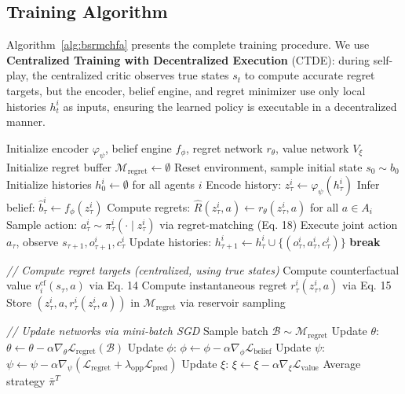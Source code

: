 \documentclass{article}
\begin{document}
\subsection{Training Algorithm}

Algorithm~\ref{alg:bsrmchfa} presents the complete training procedure. We use \textbf{Centralized Training with Decentralized Execution} (CTDE): during self-play, the centralized critic observes true states $s_t$ to compute accurate regret targets, but the encoder, belief engine, and regret minimizer use only local histories $h_t^i$ as inputs, ensuring the learned policy is executable in a decentralized manner.

\begin{algorithm}[t]
\caption{B-SRM-CHFA Training}
\label{alg:bsrmchfa}
\begin{algorithmic}[1]
\STATE Initialize encoder $\varphi_\psi$, belief engine $f_\phi$, regret network $r_\theta$, value network $V_\xi$
\STATE Initialize regret buffer $\mathcal{M}_{\text{regret}} \gets \emptyset$
    \STATE Reset environment, sample initial state $s_0 \sim b_0$
    \STATE Initialize histories $h_0^i \gets \emptyset$ for all agents $i$
            \STATE Encode history: $z_\tau^i \gets \varphi_\psi(h_\tau^i)$
            \STATE Infer belief: $\hat{b}_\tau^i \gets f_\phi(z_\tau^i)$
            \STATE Compute regrets: $\hat{R}(z_\tau^i, a) \gets r_\theta(z_\tau^i, a)$ for all $a \in A_i$
            \STATE Sample action: $a_\tau^i \sim \pi_\tau^i(\cdot \mid z_\tau^i)$ via regret-matching (Eq. 18)
        \ENDFOR
        \STATE Execute joint action $a_\tau$, observe $s_{\tau+1}, o_{\tau+1}^i, c_\tau^i$
        \STATE Update histories: $h_{\tau+1}^i \gets h_\tau^i \cup \{(o_{\tau}^i, a_{\tau}^i, c_{\tau}^i)\}$
            \STATE \textbf{break}
        \ENDIF
    \ENDFOR
    
    \STATE \textit{// Compute regret targets (centralized, using true states)}
            \STATE Compute counterfactual value $v_i^{\text{cf}}(s_\tau, a)$ via Eq. 14
            \STATE Compute instantaneous regret $r_\tau^i(z_\tau^i, a)$ via Eq. 15
            \STATE Store $(z_\tau^i, a, r_\tau^i(z_\tau^i, a))$ in $\mathcal{M}_{\text{regret}}$ via reservoir sampling
        \ENDFOR
    \ENDFOR
    
    \STATE \textit{// Update networks via mini-batch SGD}
    \STATE Sample batch $\mathcal{B} \sim \mathcal{M}_{\text{regret}}$
    \STATE Update $\theta$: $\theta \gets \theta - \alpha \nabla_\theta \mathcal{L}_{\text{regret}}(\mathcal{B})$
    \STATE Update $\phi$: $\phi \gets \phi - \alpha \nabla_\phi \mathcal{L}_{\text{belief}}$
    \STATE Update $\psi$: $\psi \gets \psi - \alpha \nabla_\psi (\mathcal{L}_{\text{regret}} + \lambda_{\text{opp}} \mathcal{L}_{\text{pred}})$
    \STATE Update $\xi$: $\xi \gets \xi - \alpha \nabla_\xi \mathcal{L}_{\text{value}}$
\ENDFOR
\RETURN Average strategy $\bar{\pi}^T$
\end{algorithmic}
\end{algorithm}
\end{document}
